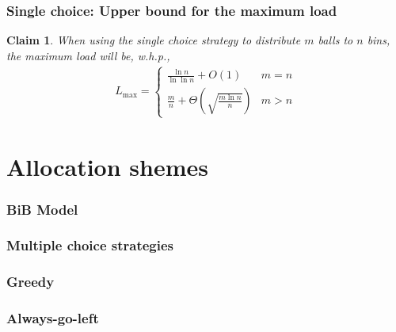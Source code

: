 \documentclass{beamer}
\newcommand\load{L_{\mathrm{max}}}
\newtheorem{claim}{Claim}
\begin{document}
\begin{frame}
\frametitle{Single choice: Upper bound for the maximum load}
\begin{claim}
When using the single choice strategy to distribute $m$ balls to $n$ bins, the maximum load will be, w.h.p.,
\begin{align}
\load = 
	\begin{cases}
    \frac{\ln n}{\ln\ln n} + O(1)              & m = n \\
    \frac{m}{n} + \Theta\left(\sqrt{\frac{m\ln n}{n}} \right)              & m > n
    \end{cases}
\end{align}
\end{claim}
\end{frame}

\begin{comment}
\begin{frame}
\frametitle{Applications}
\begin{itemize}
	\item Hashing
	\item Online load balancing
	\item Emulating PRAMs on DMMs
	\item Low congestion circuit routing
\end{itemize}
\end{frame}
\end{comment}


\section{Allocation shemes}
\begin{frame}
\frametitle{BiB Model}
\end{frame}

\begin{frame}
\frametitle{Multiple choice strategies}
\end{frame}

\begin{frame}
\frametitle{Greedy}
\end{frame}

\begin{frame}
\frametitle{Always-go-left}
\end{frame}
\end{document}
